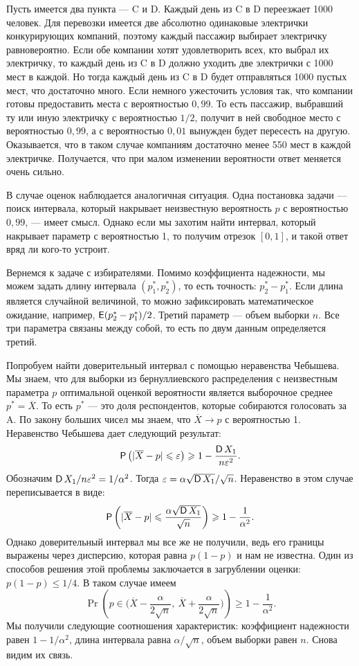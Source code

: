 \begin{example}
    Пусть имеется два пункта --- C и D. Каждый день из C в D переезжает 1000 человек.
    Для перевозки имеется две абсолютно одинаковые электрички конкурирующих компаний, поэтому каждый пассажир выбирает электричку равновероятно.
    Если обе компании хотят удовлетворить всех, кто выбрал их электричку, то каждый день из C в D должно уходить две электрички с 1000 мест в каждой.
    Но тогда каждый день из C в D будет отправляться 1000 пустых мест, что достаточно много.
    Если немного ужесточить условия так, что компании готовы предоставить места с вероятностью $0,99$.
    То есть пассажир, выбравший ту или иную электричку с вероятностью $1/2$, получит в ней свободное место с вероятностью $0,99$, а с вероятностью $0,01$ вынужден будет пересесть на другую.
    Оказывается, что в таком случае компаниям достаточно менее 550 мест в каждой электричке.
    Получается, что при малом изменении вероятности ответ меняется очень сильно.
\end{example}

В случае оценок наблюдается аналогичная ситуация.
Одна постановка задачи --- поиск интервала, который накрывает неизвестную вероятность $p$ с вероятностью $0,99$, --- имеет смысл.
Однако если мы захотим найти интервал, который накрывает параметр с вероятностью 1, то получим отрезок $[0, 1]$, и такой ответ вряд ли кого-то устроит.

Вернемся к задаче с избирателями.
Помимо коэффициента надежности, мы можем задать длину интервала $(p_1^*, p_2^*)$, то есть точность: $p_2^* - p_1^*$.
Если длина является случайной величиной, то можно зафиксировать математическое ожидание, например, $\E(p_2^* - p_1^*)/2$.
Третий параметр --- объем выборки $n$.
Все три параметра связаны между собой, то есть по двум данным определяется третий.

Попробуем найти доверительный интервал с помощью неравенства Чебышева.
Мы знаем, что для выборки из бернуллиевского распределения с неизвестным параметра $p$ оптимальной оценкой вероятности является выборочное среднее $p^* = \overline{X}$. То есть $p^*$ --- это доля респондентов, которые собираются голосовать за A.
По закону больших чисел мы знаем, что $\overline{X} \longrightarrow p$ с вероятностью 1. Неравенство Чебышева дает следующий результат:
\[
    \Pr\left(|\overline{X} - p| \leqslant \epsilon\right) \geqslant 1 - \frac{\D X_1}{n \epsilon^2}.
\]
Обозначим $\D X_1 / n \epsilon^2 = 1 / \alpha^2$. Тогда $\epsilon = \alpha \sqrt{\D X_1} / \sqrt{n}$. Неравенство в этом случае переписывается в виде:
\[
    \Pr\left(|\overline{X} - p| \leqslant \frac{\alpha \sqrt{\D X_1}}{\sqrt{n}}\right) \geqslant 1 - \frac{1}{\alpha^2}.
\]
Однако доверительный интервал мы все же не получили, ведь его границы выражены через дисперсию, которая равна $p(1-p)$ и нам не известна.
Один из способов решения этой проблемы заключается в загрублении оценки: $p(1-p) \leqslant 1/4$.
В таком случае имеем
\[
    \Pr\left( p \in \Big( \overline{X} - \frac{\alpha}{2\sqrt{n}},\ \overline{X} + \frac{\alpha}{2\sqrt{n}} \Big) \right) \geqslant 1 - \frac{1}{\alpha^2}.
\]
Мы получили следующие соотношения характеристик: коэффициент надежности равен $1 - 1 / \alpha^2$, длина интервала равна $\alpha / \sqrt{n}$, объем выборки равен $n$.
Снова видим их связь.

